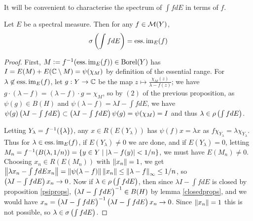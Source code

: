 \documentclass[10pt]{amsart}
\begin{document}
It will be convenient to characterise the spectrum of $\int f dE$ in terms of $f$. %
\begin{proposition}\label{essimspec} %
    Let $E$ be a spectral measure. Then for any $f \in \mathcal{M}(Y)$,
    $$
        \sigma\left(  \int f dE  \right) = \operatorname{ess.im}_E(f)
    $$
\end{proposition}
\begin{proof}
    First, $M \vcentcolon= f^{-1}(\operatorname{ess.im}_E(f)) \in \operatorname{Borel}(Y)$ has $I = E(M) + E(\mathbb{C} \setminus M) = \psi(\chi_M)$ by definition of the essential range. For $\lambda \not\in \operatorname{ess.im}_E(f)$, let $g : Y \to \mathbb{C}$ be the map $z \mapsto \frac{\chi_M(z)}{\lambda - f(z)}$; we have $g \cdot (\lambda - f) = (\lambda - f) \cdot g = \chi_M$, so by $(2)$ of the previous proposition, as $\psi(g) \in B(H)$ and $\psi(\lambda - f) = \lambda I - \int f dE$, we have $\psi(g)\left(  \lambda I - \int f dE  \right) \subset \left(  \lambda I - \int f dE  \right)\psi(g) = \psi(\chi_M) = I$ %
    and thus $\lambda \in \rho\left(  \int f dE  \right)$. 
    
    Letting $Y_\lambda = f^{-1}(\left\{  \lambda  \right\})$, any $x \in R(E(Y_\lambda))$ has $\psi(f)x = \lambda x$ as $f\chi_{Y_\lambda} = \lambda\chi_{Y_\lambda}$. Thus for $\lambda \in \operatorname{ess.im}_E(f)$, if $E(Y_\lambda) \neq 0$ we are done, and if $E(Y_\lambda) = 0$, letting $M_n = f^{-1}(B(\lambda, 1/n)) = \left\{  y \in Y \mid \left| \lambda - f(y) \right| < 1/n  \right\}$, we must have $E(M_n) \neq 0$. Choosing $x_n \in R(E(M_n))$ with $\left\| x_n \right\| = 1$, we get $\left\| \lambda x_n - \int f dE x_n \right\| = \left\| \psi(\lambda - f) \right\|\left\| x_n \right\| \leq \left\| \lambda - f \right\|_\infty \leq 1/n$, so $\left(  \lambda I - \int f dE  \right)x_n \to 0$. Now if $\lambda \in \rho\left(  \int f dE  \right)$, then since $\lambda I - \int f dE$ is closed by proposition \ref{psiprops}, $\left(  \lambda I - \int f dE  \right)^{-1} \in B(H)$ by lemma \ref{closedprops}, and we would have $x_n = \left(  \lambda I - \int f dE  \right)^{-1}\left(  \lambda I - \int f dE  \right)x_n \to 0$. Since $\left\| x_n \right\| = 1$ this is not possible, so $\lambda \in \sigma\left(  \int f dE  \right)$.
\end{proof}
\end{document}
